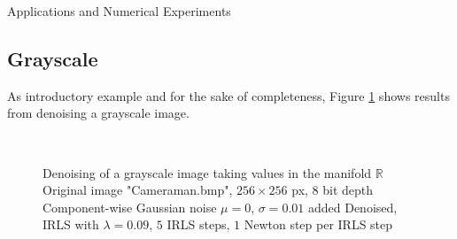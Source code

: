 \begin{chapter}{Applications and Numerical Experiments}
\subsection{Grayscale} %
As introductory example and for the sake of completeness, Figure \ref{fig:application_gray} shows results from denoising a grayscale image.
\label{sub:Grayscale}
\begin{figure}[h!]
    \centering
    \\
    \caption[Color image "Cameraman" grayscale denoising]{Denoising of a grayscale image taking values in the manifold $\mathbb{R}$
	 Original image "Cameraman.bmp", $256\times 256$ px, 8 bit depth
	 Component-wise Gaussian noise $\mu=0$, $\sigma=0.01$ added
	 Denoised, IRLS with $\lambda=0.09$, $5$ IRLS steps, $1$ Newton step per IRLS step
	\label{fig:application_gray}
    }
\end{figure}


\end{chapter}
